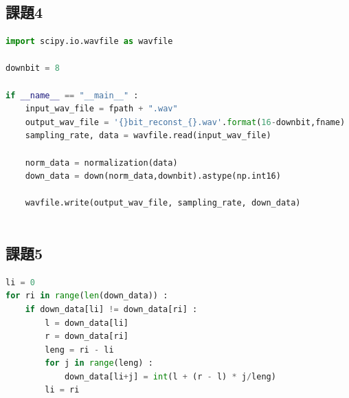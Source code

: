 \documentclass[a4j,11pt]{jarticle}
\begin{document}
    \subsection{課題4}
    \begin{lstlisting}[language=Python, caption=reconst.py]
import scipy.io.wavfile as wavfile

downbit = 8

if __name__ == "__main__" :
    input_wav_file = fpath + ".wav"
    output_wav_file = '{}bit_reconst_{}.wav'.format(16-downbit,fname)
    sampling_rate, data = wavfile.read(input_wav_file)

    norm_data = normalization(data)
    down_data = down(norm_data,downbit).astype(np.int16)

    wavfile.write(output_wav_file, sampling_rate, down_data)
        
    \end{lstlisting}
    \subsection{課題5}
    \begin{lstlisting}[language=Python, caption=liear\_interpolation.py]
li = 0
for ri in range(len(down_data)) :
    if down_data[li] != down_data[ri] :
        l = down_data[li]
        r = down_data[ri]
        leng = ri - li
        for j in range(leng) :
            down_data[li+j] = int(l + (r - l) * j/leng)
        li = ri
    \end{lstlisting}
    
\end{document}
